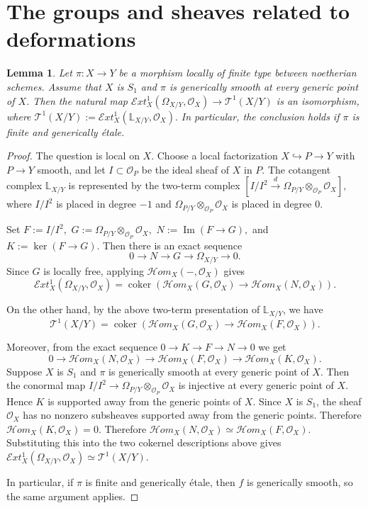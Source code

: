 \documentclass[11pt,twoside]{amsart}
\theoremstyle{plain}
\numberwithin{equation}{section}
\newtheorem{lemma}[theorem]{Lemma}
\theoremstyle{definition}
\begin{document}
\section{The groups and sheaves related to deformations}

\begin{lemma}\label{lem:T1-relative-differentials}
Let $\pi:X\to Y$ be a morphism locally of finite type between noetherian schemes. Assume that $X$ is $S_1$ and $\pi$ is generically smooth at every generic point of $X$.  
Then the natural map
$
\mathcal E xt_X^1(\Omega_{X/Y},\mathcal O_X)
\longrightarrow
\mathcal T^1(X/Y)
$
is an isomorphism, where
$
\mathcal T^1(X/Y):=\mathcal E xt_X^1(\mathbb L_{X/Y},\mathcal O_X).
$
In particular, the conclusion holds if $\pi$ is finite and generically étale.
\end{lemma}

\begin{proof}
The question is local on $X$. Choose a local factorization
$
X\hookrightarrow P\to Y
$
with $P\to Y$ smooth, and let $I\subset \mathcal O_P$ be the ideal sheaf of $X$ in $P$. The cotangent complex $\mathbb L_{X/Y}$ is represented by the two-term complex
$
\left[
I/I^2
\xrightarrow{d}
\Omega_{P/Y}\otimes_{\mathcal O_P}\mathcal O_X
\right],
$
where $I/I^2$ is placed in degree $-1$ and $\Omega_{P/Y}\otimes_{\mathcal O_P}\mathcal O_X$ is placed in degree $0$.

Set $F:=I/I^2,$ $G:=\Omega_{P/Y}\otimes_{\mathcal O_P}\mathcal O_X,$ $
N:=\operatorname{Im}(F\to G),$ and $K:=\ker(F\to G).$
Then there is an exact sequence
$$
0\to N\to G\to \Omega_{X/Y}\to0.
$$
Since $G$ is locally free, applying $\mathcal H om_X(-,\mathcal O_X)$ gives
$$
\mathcal E xt_X^1(\Omega_{X/Y},\mathcal O_X) =
\operatorname{coker}
\left(
\mathcal H om_X(G,\mathcal O_X)
\to
\mathcal H om_X(N,\mathcal O_X)
\right).
$$

On the other hand, by the above two-term presentation of $\mathbb L_{X/Y}$, we have
$$
\mathcal T^1(X/Y) =
\operatorname{coker}
\left(
\mathcal H om_X(G,\mathcal O_X)
\to
\mathcal H om_X(F,\mathcal O_X)
\right).
$$


Moreover, from the exact sequence
$
0\to K\to F\to N\to0
$
we get
$$
0\to
\mathcal H om_X(N,\mathcal O_X)
\to
\mathcal H om_X(F,\mathcal O_X)
\to
\mathcal H om_X(K,\mathcal O_X).
$$
Suppose $X$ is $S_1$ and $\pi$ is generically smooth at every generic point of $X$. Then the conormal map
$
I/I^2\to \Omega_{P/Y}\otimes_{\mathcal O_P}\mathcal O_X
$
is injective at every generic point of $X$. Hence $K$ is supported away from the generic points of $X$. Since $X$ is $S_1$, the sheaf $\mathcal O_X$ has no nonzero subsheaves supported away from the generic points. Therefore
$
\mathcal H om_X(K,\mathcal O_X)=0.
$
Therefore
$
\mathcal H om_X(N,\mathcal O_X)
\simeq
\mathcal H om_X(F,\mathcal O_X).
$
Substituting this into the two cokernel descriptions above gives
$
\mathcal E xt_X^1(\Omega_{X/Y},\mathcal O_X)
\simeq
\mathcal T^1(X/Y).
$

In particular, if $\pi$ is finite and generically étale, then $f$ is generically smooth, so the same argument applies.
\end{proof}
\end{document}
